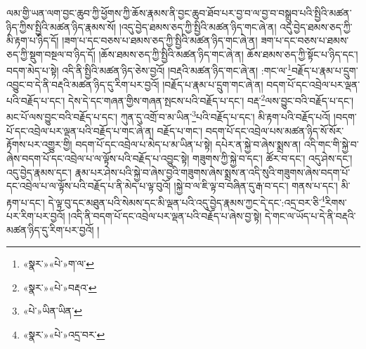 ལམ་གྱི་ཡན་ལག་བྱང་ཆུབ་ཀྱི་ཕྱོགས་ཀྱི་ཆོས་རྣམས་ནི་བྱང་ཆུབ་ཐོབ་པར་བྱ་བ་ལ་བྱ་བ་བསྒྲུབ་པའི་སྤྱིའི་མཚན་ཉིད་ཀྱིས་སྤྱིའི་མཚན་ཉིད་རྣམས་སོ། །འདུ་བྱེད་ཐམས་ཅད་ཀྱི་སྤྱིའི་མཚན་ཉིད་གང་ཞེ་ན། འདུ་བྱེད་ཐམས་ཅད་ཀྱི་མི་རྟག་པ་ཉིད་དོ། །ཟག་པ་དང་བཅས་པ་ཐམས་ཅད་ཀྱི་སྤྱིའི་མཚན་ཉིད་གང་ཞེ་ན། ཟག་པ་དང་བཅས་པ་ཐམས་ཅད་ཀྱི་སྡུག་བསྔལ་བ་ཉིད་དོ། །ཆོས་ཐམས་ཅད་ཀྱི་སྤྱིའི་མཚན་ཉིད་གང་ཞེ་ན། ཆོས་ཐམས་ཅད་ཀྱི་སྟོང་པ་ཉིད་དང་། བདག་མེད་པ་སྟེ། འདི་ནི་སྤྱིའི་མཚན་ཉིད་ཅེས་བྱའོ། །བརྡའི་མཚན་ཉིད་གང་ཞེ་ན། :གང་ལ་\footnote{«སྣར་»«པེ་»ག་ལ་}བརྗོད་པ་རྣམ་པ་དྲུག་འབྱུང་བ་དེ་ནི་བརྡའི་མཚན་ཉིད་དུ་རིག་པར་བྱའོ། །བརྗོད་པ་རྣམ་པ་དྲུག་གང་ཞེ་ན། བདག་པོ་དང་འབྲེལ་པར་ལྡན་པའི་བརྗོད་པ་དང་། དེས་དེ་དང་གཞན་གྱིས་གཞན་སྤངས་པའི་བརྗོད་པ་དང་། བརྡ་\footnote{«སྣར་»«པེ་»བརྡའ་}ལས་བྱུང་བའི་བརྗོད་པ་དང་། མང་པོ་ལས་བྱུང་བའི་བརྗོད་པ་དང་། ཀུན་དུ་འགྲོ་བ་མ་ཡིན་\footnote{«པེ་»ཡིན་ཡིན་}པའི་བརྗོད་པ་དང་། མི་རྟག་པའི་བརྗོད་པའོ། །བདག་པོ་དང་འབྲེལ་པར་ལྡན་པའི་བརྗོད་པ་གང་ཞེ་ན། བརྗོད་པ་གང་། བདག་པོ་དང་འབྲེལ་པས་མཚན་ཉིད་སོ་སོར་རྟོགས་པར་འགྱུར་གྱི། བདག་པོ་དང་འབྲེལ་པ་མེད་པ་མ་ཡིན་པ་སྟེ། དཔེར་ན་སྐྱེ་བ་ཞེས་སྨྲས་ན། འདི་གང་གི་སྐྱེ་བ་ཞེས་བདག་པོ་དང་འབྲེལ་པ་ལ་ལྟོས་པའི་བརྗོད་པ་འབྱུང་སྟེ། གཟུགས་ཀྱི་སྐྱེ་བ་དང་། ཚོར་བ་དང་། འདུ་ཤེས་དང་། འདུ་བྱེད་རྣམས་དང་། རྣམ་པར་ཤེས་པའི་སྐྱེ་བ་ཞེས་བྱའི་གཟུགས་ཞེས་སྨྲས་ན་འདི་སུའི་གཟུགས་ཞེས་བདག་པོ་དང་འབྲེལ་པ་ལ་ལྟོས་པའི་བརྗོད་པ་ནི་མེད་པ་ལྟ་བུའོ། །སྐྱེ་བ་ལ་ཇི་ལྟ་བ་བཞིན་དུ་རྒ་བ་དང་། གནས་པ་དང་། མི་རྟག་པ་དང་། དེ་ལྟ་བུ་དང་མཐུན་པའི་སེམས་དང་མི་ལྡན་པའི་འདུ་བྱེད་རྣམས་ཀྱང་དེ་དང་:འདྲ་བར་ཅི་\footnote{«སྣར་»«པེ་»འདྲ་བར་}རིགས་པར་རིག་པར་བྱའོ། །འདི་ནི་བདག་པོ་དང་འབྲེལ་པར་ལྡན་པའི་བརྗོད་པ་ཞེས་བྱ་སྟེ། དེ་གང་ལ་ཡོད་པ་དེ་ནི་བརྡའི་མཚན་ཉིད་དུ་རིག་པར་བྱའོ། །
